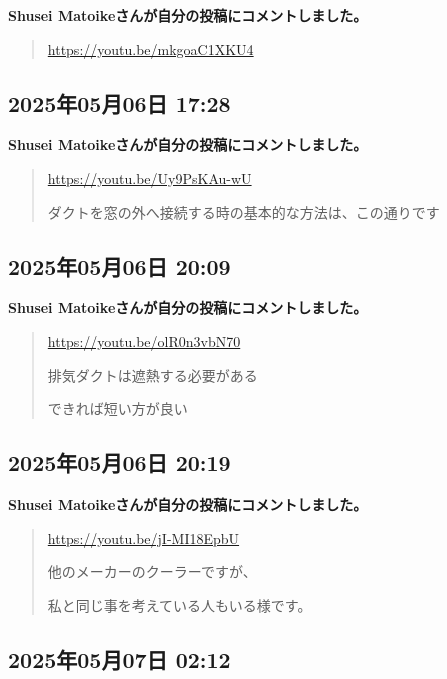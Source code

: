 \textbf{Shusei Matoikeさんが自分の投稿にコメントしました。}

\begin{quote}
\url{https://youtu.be/mkgoaC1XKU4}
\end{quote}

\subsection*{2025年05月06日 17:28}

\textbf{Shusei Matoikeさんが自分の投稿にコメントしました。}

\begin{quote}
\url{https://youtu.be/Uy9PsKAu-wU}

ダクトを窓の外へ接続する時の基本的な方法は、この通りです
\end{quote}

\subsection*{2025年05月06日 20:09}

\textbf{Shusei Matoikeさんが自分の投稿にコメントしました。}

\begin{quote}
\url{https://youtu.be/olR0n3vbN70}

排気ダクトは遮熱する必要がある

できれば短い方が良い
\end{quote}

\subsection*{2025年05月06日 20:19}

\textbf{Shusei Matoikeさんが自分の投稿にコメントしました。}

\begin{quote}
\url{https://youtu.be/jI-MI18EpbU}

他のメーカーのクーラーですが、

私と同じ事を考えている人もいる様です。
\end{quote}

\subsection*{2025年05月07日 02:12}

